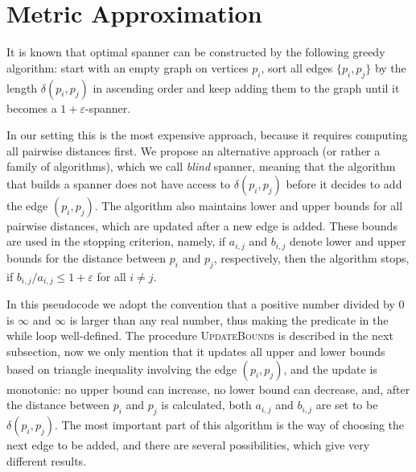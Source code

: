 \documentclass[a4paper,USenglish]{socg-lipics-v2018}
\newcommand{\eps}{\varepsilon}
\newcommand{\dist}{\delta}
\begin{document}
\section{Metric Approximation}

It is known that optimal spanner can be constructed by the following greedy algorithm: 
start with an empty graph on vertices $p_i$,
sort all edges $\{p_i, p_j\}$ by the length $\dist(p_i, p_j)$ in ascending order and keep adding them to the graph
until it becomes a $1+\eps$-spanner. 


 In our setting this is the most expensive approach, because it requires
 computing all pairwise distances first. We propose an alternative approach (or rather a family of algorithms), which we call
 \textit{blind} spanner, meaning that the algorithm that builds a spanner does not have access to $\dist(p_i, p_j)$
 before it decides to add the edge $(p_i, p_j)$.
 The algorithm also maintains lower and upper bounds
 for all pairwise distances, which are updated after a new edge is added.
 These bounds are used in the stopping criterion, namely, if $a_{i, j}$ and $b_{i,j}$ denote lower and upper bounds
 for the distance between $p_i$ and $p_j$, respectively, 
 then the algorithm stops, if $b_{i,j} / a_{i, j} \leq 1 + \eps$
 for all $i \neq j$.

\begin{algorithmic}
\label{alg:blind_spanner}
\Function{BlindSpanner}{$P, \eps$}
    \While {$\exists i \neq j : b_{i,j} / a_{i,j} > 1 + \eps$}
     
    \State {$v \gets \dist(p_i, pj)$}
    \State {}
    \EndWhile
\EndFunction
\end{algorithmic}


In this pseudocode we adopt the convention that a positive number divided by 0 is $\infty$
and $\infty$ is larger than any real number,
thus making the predicate in the while loop well-defined.  The procedure \textsc{UpdateBounds} is described in the next subsection,
now we only mention that it updates all upper and lower bounds based on triangle inequality involving the edge $(p_i, p_j)$,
and the update is monotonic: no upper bound can increase, no lower bound can decrease, and, after the distance
between $p_i$ and $p_j$ is calculated, both $a_{i,j}$ and  $b_{i,j}$ are set to be $\dist(p_i, p_j)$.
The most important part of this algorithm is the way of choosing the next edge to be added, and
there are several possibilities, which give very different results.
\end{document}
